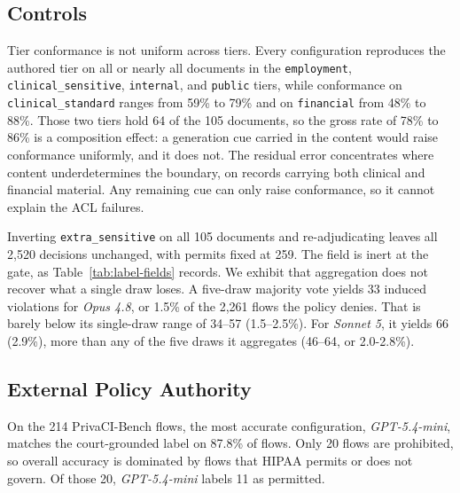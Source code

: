 \subsection{Controls}
\label{sec:controls}
Tier conformance is not uniform across tiers. Every configuration reproduces
the authored tier on all or nearly all documents in the \texttt{employment},
\texttt{clinical\_sensitive}, \texttt{internal}, and \texttt{public} tiers,
while conformance on \texttt{clinical\_standard} ranges from 59\% to 79\% and
on \texttt{financial} from 48\% to 88\%. Those two tiers hold 64 of the 105
documents, so the gross rate of 78\% to 86\% is a composition effect: a
generation cue carried in the content would raise conformance uniformly, and it
does not. The residual error concentrates where content underdetermines the
boundary, on records carrying both clinical and financial material. Any
remaining cue can only raise conformance, so it cannot explain the ACL
failures.

Inverting \texttt{extra\_sensitive} on all 105 documents and re-adjudicating
leaves all 2,520 decisions unchanged, with permits fixed at 259. The field is
inert at the gate, as Table~\ref{tab:label-fields} records. We exhibit that aggregation does not recover what a single draw loses. A five-draw majority vote yields 33 induced violations for {\em Opus 4.8}, or 1.5\% of the 2,261 flows the policy denies. That is barely below its single-draw range of 34--57 (1.5--2.5\%). For {\em Sonnet 5}, it yields 66
(2.9\%), more than any of the five draws it aggregates (46--64, or 2.0-2.8\%). %

\subsection{External Policy Authority}
\label{sec:privaci-results}
On the 214 PrivaCI-Bench flows, the most accurate configuration,
{\em GPT-5.4-mini}, matches the court-grounded label on 87.8\% of flows. Only
20 flows are prohibited, so overall accuracy is dominated by flows that HIPAA
permits or does not govern. Of those 20, {\em GPT-5.4-mini} labels 11 as
permitted.
